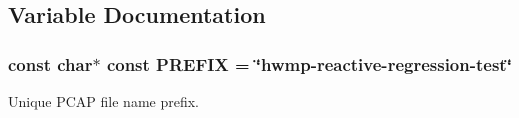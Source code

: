 \subsection{Variable Documentation}
\subsubsection[{\texorpdfstring{P\+R\+E\+F\+IX}{PREFIX}}]{\setlength{\rightskip}{0pt plus 5cm}const char$\ast$ const P\+R\+E\+F\+IX = \char`\"{}hwmp-\/reactive-\/regression-\/{\bf test}\char`\"{}}\hypertarget{hwmp-reactive-regression_8cc_a61dc66981fa47bfd0066a57a487c599c}{}\label{hwmp-reactive-regression_8cc_a61dc66981fa47bfd0066a57a487c599c}


Unique P\+C\+AP file name prefix. 

